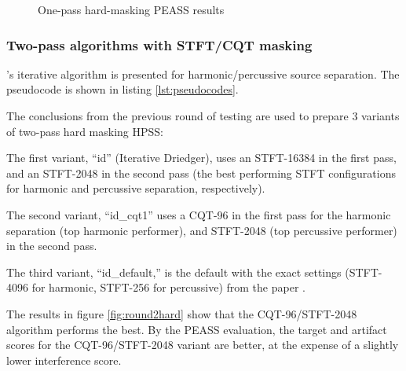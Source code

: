 \documentclass[letter,12pt]{article}
\newenvironment{tight_enumerate}{
\begin{enumerate}
  \setlength{\itemsep}{0pt}
  \setlength{\parskip}{0pt}
}{\end{enumerate}}
\begin{document}
\begin{figure}[ht]
	\centering
	\vspace{-1.25em}
	\caption{One-pass hard-masking PEASS results}
	\label{fig:round1hard}
\end{figure}

\subsubsection{Two-pass algorithms with STFT/CQT masking}

\citet{driedger}'s iterative algorithm is presented for harmonic/percussive source separation. The pseudocode is shown in listing \ref{lst:pseudocodes}.

The conclusions from the previous round of testing are used to prepare 3 variants of two-pass hard masking HPSS:
\begin{tight_enumerate}
	\item
		The first variant, ``id'' (Iterative Driedger), uses an STFT-16384 in the first pass, and an STFT-2048 in the second pass (the best performing STFT configurations for harmonic and percussive separation, respectively).
	\item
		The second variant, ``id\_cqt1'' uses a CQT-96 in the first pass for the harmonic separation (top harmonic performer), and STFT-2048 (top percussive performer) in the second pass.
	\item
		The third variant, ``id\_default,'' is the default with the exact settings (STFT-4096 for harmonic, STFT-256 for percussive) from the paper \cite{driedger}.
\end{tight_enumerate}

The results in figure \ref{fig:round2hard} show that the CQT-96/STFT-2048 algorithm performs the best. By the PEASS evaluation, the target and artifact scores for the CQT-96/STFT-2048 variant are better, at the expense of a slightly lower interference score.
\end{document}

